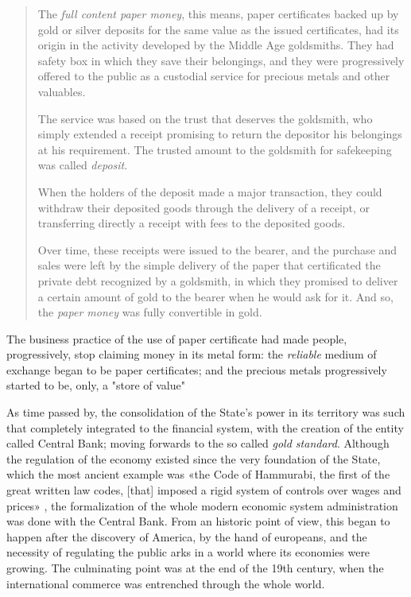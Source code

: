 \documentclass[12pt,a4paper,twoside]{book}
\begin{document}
\begin{quotation}
The \textit{full content paper money}, this means, paper certificates backed up by gold or silver deposits for the same value as the issued certificates, had its origin in the activity developed by the Middle Age goldsmiths. They had safety box in which they save their belongings, and they were progressively offered to the public as a custodial service for precious metals and other valuables.

The service was based on the trust that deserves the goldsmith, who simply extended a receipt promising to return the depositor his belongings at his requirement. The trusted amount to the goldsmith for safekeeping was called \textit{deposit}.

When the holders of the deposit made a major transaction, they could withdraw their deposited goods through the delivery of a receipt, or transferring directly a receipt with fees to the deposited goods.

Over time, these receipts were issued to the bearer, and the purchase and sales were left by the simple delivery of the paper that certificated the private debt recognized by a goldsmith, in which they promised to deliver a certain amount of gold to the bearer when he would ask for it. And so, the \textit{paper money} was fully convertible in gold. \cite[p. 265]{mochobeker}
\end{quotation}

The business practice of the use of paper certificate had made people, progressively, stop claiming money in its metal form: the \textit{reliable} medium of exchange began to be paper certificates; and the precious metals progressively started to be, only, a "store of value"

As time passed by, the consolidation of the State's power in its territory was such that completely integrated to the financial system, with the creation of the entity called Central Bank; moving forwards to the so called \textit{gold standard}. Although the regulation of the economy existed since the very foundation of the State, which the most ancient example was «the Code of Hammurabi, the first of the great written law codes, [that] imposed a rigid system of controls over wages and prices» \cite[p. 11]{fortycenturies}, the formalization of the whole modern economic system administration was done with the Central Bank. From an historic point of view, this began to happen after the discovery of America, by the hand of europeans, and the necessity of regulating the public arks in a world where its economies were growing. The culminating point was at the end of the 19th century, when the international commerce was entrenched through the whole world.
\end{document}
